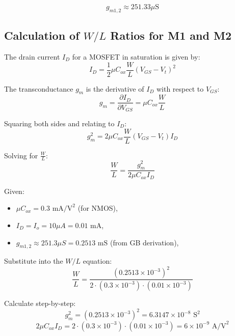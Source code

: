 \begin{equation}
    g_{m1,2} \approx 251.33 \mu\text{S}
\end{equation}

\subsection{Calculation of $W/L$ Ratios for M1 and M2}
The drain current $I_D$ for a MOSFET in saturation is given by:
\begin{equation}
    I_D = \frac{1}{2} \mu C_{ox} \frac{W}{L} (V_{GS} - V_t)^2
\end{equation}

The transconductance $g_m$ is the derivative of $I_D$ with respect to $V_{GS}$:
\begin{equation}
    g_m = \frac{\partial I_D}{\partial V_{GS}} = \mu C_{ox} \frac{W}{L}
\end{equation}

Squaring both sides and relating to $I_D$:
\begin{equation}
    g_m^2 = 2 \mu C_{ox} \frac{W}{L} (V_{GS} - V_t) I_D
\end{equation}

Solving for $\frac{W}{L}$:
\begin{equation}
    \frac{W}{L} = \frac{g_m^2}{2 \mu C_{ox} I_D}
\end{equation}

Given:
\begin{itemize}
    \item $\mu C_{ox} = 0.3 \text{ mA/V}^2$ (for NMOS),
    \item $I_D = I_o = 10 \mu A = 0.01 \text{ mA}$,
    \item $g_{m1,2} \approx 251.3 \mu S = 0.2513 \text{ mS}$ (from GB derivation),
\end{itemize}

Substitute into the $W/L$ equation:
\begin{equation}
    \frac{W}{L} = \frac{(0.2513 \times 10^{-3})^2}{2 \cdot (0.3 \times 10^{-3}) \cdot (0.01 \times 10^{-3})}
\end{equation}

Calculate step-by-step:
\begin{equation}
    g_m^2 = (0.2513 \times 10^{-3})^2 = 6.3147 \times 10^{-8} \text{ S}^2
\end{equation}
\begin{equation}
    2 \mu C_{ox} I_D = 2 \cdot (0.3 \times 10^{-3}) \cdot (0.01 \times 10^{-3}) = 6 \times 10^{-9} \text{ A/V}^2
\end{equation}

